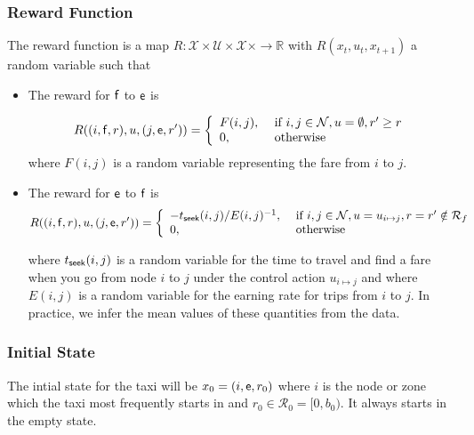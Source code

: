 \documentclass{article}
\newcommand{\mc}{\mathcal}
\newcommand{\mb}{\mathbb}
\newcommand{\rar}{\rightarrow}
\newcommand{\sn}[1]{{\sf{#1}}}
\newcommand{\e}{{\sf e}}
\newcommand{\f}{{\sf f}}
\begin{document}
\subsubsection{Reward Function}
The reward function is a map $R:\mc{X}\times \mc{U}\times \mc{X}\times \rar \mb{R}$ with $R(x_{t},u_t,x_{t+1})$ a random variable such that
\begin{itemize}
\item The reward for $\f$ to $\e$ is 

\[R( (i,\f,r), u, (j,\e,r'))=\left\{\begin{array}{ll}F(i,j), & \ \text{if}\ i,j\in \mc{N}, u=\emptyset, r'\geq r\\ 0, & \ \text{otherwise}\end{array}\right.\]
where $F(i,j)$ is a random variable representing the fare from $i$ to $j$. 


\item The reward for $\e$ to $\f$ is 
\[R((i,\f,r), u, (j,\e,r'))=\left\{\begin{array}{ll}-t_{\text{\sn{seek}}}(i,j)/E(i,j)^{-1}, & \ \text{if}\ i,j\in \mc{N}, u=u_{i\mapsto j}, r=r'\notin \mc{R}_f\\
0, & \ \text{otherwise}\end{array}\right.\]

where $t_{\text{\sn{seek}}}(i,j)$ is a random variable for the time to travel and find a fare when you go from node $i$ to $j$ under the control action $u_{i\mapsto j}$ and where $E(i,j)$ is a random variable for the earning rate for trips from $i$ to $j$. In practice, we infer the mean values of these quantities from the data.
\end{itemize}

\subsubsection{Initial State}
The intial state for the taxi will be $x_0=(i,\e,r_0)$ where $i$ is the node or
zone which the taxi most frequently starts in and $r_0\in \mc{R}_0=[0,b_0)$. It always starts in the empty state.
\end{document}

